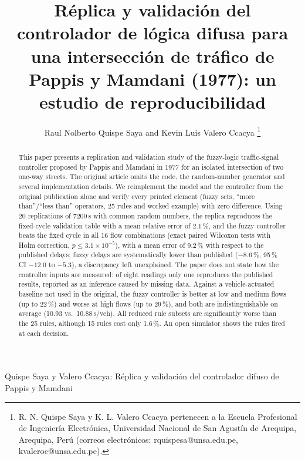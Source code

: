 \documentclass[journal]{IEEEtran}
\begin{document}
\title{Réplica y validación del controlador de lógica difusa para una intersección de tráfico de Pappis y Mamdani (1977): un estudio de reproducibilidad}

\author{Raul Nolberto Quispe Saya and Kevin Luis Valero Ccacya%
\thanks{R. N. Quispe Saya y K. L. Valero Ccacya pertenecen a la Escuela Profesional de Ingeniería Electrónica, Universidad Nacional de San Agustín de Arequipa, Arequipa, Perú (correos electrónicos: rquispesa@unsa.edu.pe, kvaleroc@unsa.edu.pe).}}

%
{Quispe Saya y Valero Ccacya: Réplica y validación del controlador difuso de Pappis y Mamdani}

\maketitle

\begin{abstract}
This paper presents a replication and validation study of the fuzzy-logic traffic-signal controller proposed by Pappis and Mamdani in 1977 for an isolated intersection of two one-way streets. The original article omits the code, the random-number generator and several implementation details. We reimplement the model and the controller from the original publication alone and verify every printed element (fuzzy sets, ``more than''/``less than'' operators, 25 rules and worked example) with zero difference. Using 20 replications of 7200\,s with common random numbers, the replica reproduces the fixed-cycle validation table with a mean relative error of 2.1\,\%, and the fuzzy controller beats the fixed cycle in all 16 flow combinations (exact paired Wilcoxon tests with Holm correction, $p\le3.1\times10^{-5}$), with a mean error of 9.2\,\% with respect to the published delays; fuzzy delays are systematically lower than published ($-8.6$\,\%, 95\,\% CI $-12.0$ to $-5.3$), a discrepancy left unexplained. The paper does not state how the controller inputs are measured: of eight readings only one reproduces the published results, reported as an inference caused by missing data. Against a vehicle-actuated baseline not used in the original, the fuzzy controller is better at low and medium flows (up to 22\,\%) and worse at high flows (up to 29\,\%), and both are indistinguishable on average (10.93 vs.\ 10.88\,s/veh). All reduced rule subsets are significantly worse than the 25 rules, although 15 rules cost only 1.6\,\%. An open simulator shows the rules fired at each decision.
\end{abstract}
\end{document}
